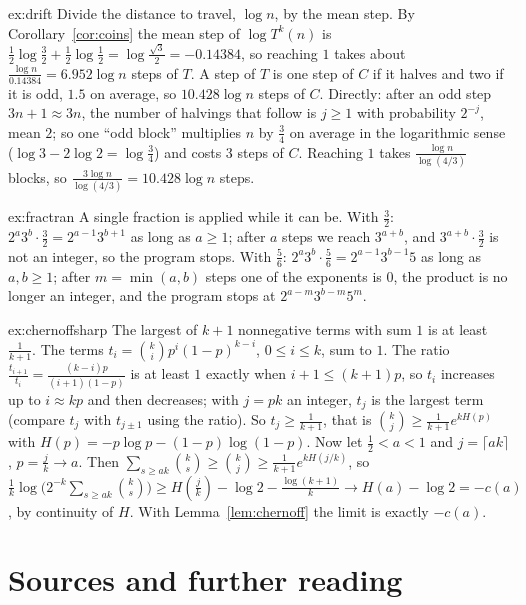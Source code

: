 \begin{solution}{ex:drift}
\idea Divide the distance to travel, $\log n$, by the mean step.
\writeup By Corollary~\ref{cor:coins} the mean step of $\log T^k(n)$ is $\frac12\log\frac32+\frac12\log\frac12=\log\frac{\sqrt3}2=-0.14384$, so reaching $1$
takes about $\frac{\log n}{0.14384}=6.952\log n$ steps of $T$. A step of $T$ is one step of $C$ if it halves and two if it is odd, $1.5$ on average, so
$10.428\log n$ steps of $C$. Directly: after an odd step $3n+1\approx3n$, the number of halvings that follow is $j\ge1$ with probability $2^{-j}$, mean
$2$; so one ``odd block'' multiplies $n$ by $\frac34$ on average in the logarithmic sense ($\log3-2\log2=\log\frac34$) and costs $3$ steps of $C$.
Reaching $1$ takes $\frac{\log n}{\log(4/3)}$ blocks, so $\frac{3\log n}{\log(4/3)}=10.428\log n$ steps.
\end{solution}

\begin{solution}{ex:fractran}
\idea A single fraction is applied while it can be.
\writeup With $\frac32$: $2^a3^b\cdot\frac32=2^{a-1}3^{b+1}$ as long as $a\ge1$; after $a$ steps we reach $3^{a+b}$, and $3^{a+b}\cdot\frac32$ is not an
integer, so the program stops. With $\frac56$: $2^a3^b\cdot\frac56=2^{a-1}3^{b-1}5$ as long as $a,b\ge1$; after $m=\min(a,b)$ steps one of the
exponents is $0$, the product is no longer an integer, and the program stops at $2^{a-m}3^{b-m}5^m$.
\end{solution}

\begin{solution}{ex:chernoffsharp}
\idea The largest of $k+1$ nonnegative terms with sum $1$ is at least $\frac1{k+1}$.
\writeup The terms $t_i=\binom kip^i(1-p)^{k-i}$, $0\le i\le k$, sum to $1$. The ratio $\frac{t_{i+1}}{t_i}=\frac{(k-i)p}{(i+1)(1-p)}$ is at least $1$
exactly when $i+1\le(k+1)p$, so $t_i$ increases up to $i\approx kp$ and then decreases; with $j=pk$ an integer, $t_j$ is the largest term (compare
$t_{j}$ with $t_{j\pm1}$ using the ratio). So $t_j\ge\frac1{k+1}$, that is $\binom kj\ge\frac1{k+1}e^{kH(p)}$ with $H(p)=-p\log p-(1-p)\log(1-p)$. Now let
$\frac12<a<1$ and $j=\lceil ak\rceil$, $p=\frac jk\to a$. Then $\sum_{s\ge ak}\binom ks\ge\binom kj\ge\frac1{k+1}e^{kH(j/k)}$, so
$\frac1k\log\bigl(2^{-k}\sum_{s\ge ak}\binom ks\bigr)\ge H(\tfrac jk)-\log2-\frac{\log(k+1)}k\to H(a)-\log2=-c(a)$, by continuity of $H$. With
Lemma~\ref{lem:chernoff} the limit is exactly $-c(a)$.
\end{solution}

\section*{Sources and further reading}

